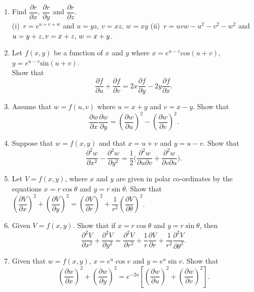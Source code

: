 \documentclass[titlepage,a4paper,12pt]{report}
\begin{document}
\begin{enumerate}
(iii), $w=\sqrt{x^2+y^2}, x=\sin t, y=e^t$.
\item Find $\dfrac{\partial r}{\partial x}, \, \dfrac{\partial r}{\partial y}$ and $\dfrac{\partial r}{\partial z}$.\\
  (i)\, $r=e^{u+v+w}$ and $u=yz, \, v=xz, \, w=xy$ (ii)\, $r=uvw-u^2-v^2-w^2$ and $u=y+z, \\ v=x+z, \, w=x+y$.
\item Let $f(x,y)$ be a function of $x$ and $y$ where $x=e^{u-v}\mbox{cos}(u+v)$, $y=e^{u-v}\mbox{sin}(u+v)$.\\
Show that \begin{equation*}
\frac{\partial f}{\partial u}+\frac{\partial f}{\partial v}=2x\frac{\partial f}{\partial y}-2y\frac{\partial f}{\partial x}.
\end{equation*}
\item Assume that $w=f(u,v)$ where $u=x+y$ and $v=x-y$. Show that 
  \[\dfrac{\partial w}{\partial x}\dfrac{\partial w}{\partial y}=\left(\dfrac{\partial w}{\partial u}\right)^2-\left(\dfrac{\partial w}{\partial v}\right)^2.\]
\item Suppose that $w=f(x,y)$ and that $x=u+v$ and $y=u-v$. Show that 
\begin{equation*}
\dfrac{\partial ^2 w}{\partial x^2}-\dfrac{\partial ^2 w}{\partial y^2}=\dfrac{1}{2}\bigg(\dfrac{\partial ^2 w}{\partial u\partial v}+\dfrac{\partial ^2 w}{\partial v\partial u}\bigg).
\end{equation*}
\item Let $V=f(x,y)$, where $x$ and $y$ are given in polar co-ordinates by the equations $x=r\cos \theta$ and $y=r\sin \theta$. Show that $\left(\dfrac{\partial V}{\partial x}\right)^2+\left(\dfrac{\partial V}{\partial y}\right)^2=\left(\dfrac{\partial V}{\partial r}\right)^2+\dfrac{1}{r^2}\left(\dfrac{\partial V}{\partial \theta}\right)^2$.
\item Given $V=f(x,y)$. Show that if $x=r\cos \theta$ and $y=r\sin \theta$, then 
\begin{equation*}
\dfrac{\partial ^2 V}{\partial x^2}+\dfrac{\partial ^2 V}{\partial y^2}=\dfrac{\partial ^2 V}{\partial r^2}+\dfrac{1}{r}\dfrac{\partial V}{\partial r}+\dfrac{1}{r^2}\dfrac{\partial ^2 V}{\partial \theta ^2}.
\end{equation*} 
 \item Given that $w=f(x,y), \, x=e^u\cos v$ and $y=e^u\sin v$. Show that 
  \[\left(\dfrac{\partial w}{\partial x}\right)^2 +\left(\dfrac{\partial w}{\partial y}\right)^2=e^{-2u}\left[\left(\dfrac{\partial w}{\partial u}\right)^2+\left(\dfrac{\partial w}{\partial v}\right)^2\right].\]
\end{enumerate}
\end{document}

